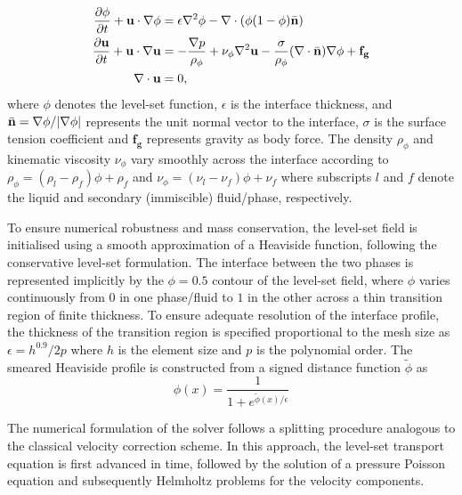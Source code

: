 \begin{subequations}
\begin{align}
    \frac{\partial \phi}{\partial t} + \mathbf{u} \cdot \nabla \phi &= \epsilon \nabla^2 \phi - \nabla \cdot (\phi(1-\phi)\Bar{\mathbf{n}})  \label{eqn.LevelSetTrack} \\
    \frac{\partial \mathbf{u}}{\partial t} + \mathbf{u} \cdot \nabla \mathbf{u} &= -\frac{\nabla p}{\rho_{\phi}} + \nu_{\phi} \nabla^2 \mathbf{u} -\frac{\sigma}{\rho_{\phi}} (\nabla \cdot \Bar{\mathbf{n}}) \nabla \phi + \mathbf{f_g} \label{eqn.LevelSetMom} \\
    \nabla \cdot \mathbf{u} &= 0,
\end{align}
\end{subequations}
where $\phi$ denotes the level-set function, $\epsilon$ is the interface thickness, and $\Bar{\mathbf{n}} = \nabla \phi / |\nabla \phi|$ represents the unit normal vector to the interface, $\sigma$ is the surface tension coefficient and $\mathbf{f_g}$ represents gravity as body force. The density $\rho_{\phi}$ and kinematic viscosity $\nu_{\phi}$ vary smoothly across the interface according to
$\rho_{\phi} = (\rho_l - \rho_f)\phi + \rho_f$ and $\nu_{\phi} = (\nu_l - \nu_f)\phi + \nu_f$ where subscripts $l$ and $f$ denote the liquid and secondary (immiscible) fluid/phase, respectively.

To ensure numerical robustness and mass conservation, the level-set field is initialised using a smooth approximation of a Heaviside function, following the conservative level-set formulation. The interface between the two phases is represented implicitly by the $\phi=0.5$ contour of the level-set field, where $\phi$ varies continuously from $0$ in one phase/fluid to $1$ in the other across a thin transition region of finite thickness. To ensure adequate resolution of the interface profile, the thickness of the transition region is specified proportional to the mesh size as $\epsilon=h^{0.9}/2p$ where $h$ is the element size and $p$ is the polynomial order. The smeared Heaviside profile is constructed from a signed distance function $\tilde{\phi}$ as
\begin{equation}
    \phi(x) = \frac{1}{1+e^{\tilde{\phi}(x)/\epsilon}}
    \label{eqn.LevelSetFunc}
\end{equation}

The numerical formulation of the solver follows a splitting procedure analogous to the classical velocity correction scheme. In this approach, the level-set transport equation is first advanced in time, followed by the solution of a pressure Poisson equation and subsequently Helmholtz problems for the velocity components.

